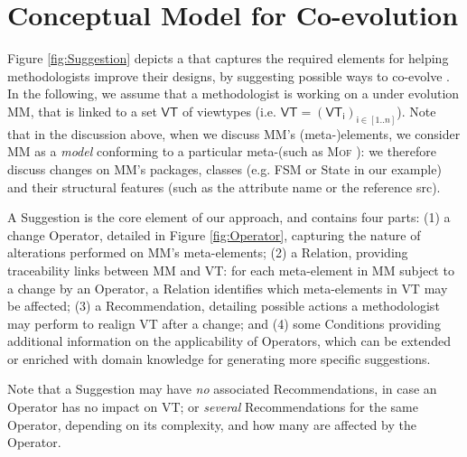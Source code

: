 \section{Conceptual Model for \Viewtype Co-evolution}
\label{sec:Suggestion}

Figure \ref{fig:Suggestion} depicts a \metamodel that captures the
required elements for helping methodologists improve their \viewtype designs,
by suggesting possible ways to co-evolve \viewtypes.
In the following, we assume that a methodologist is working on a \metamodel
under evolution \textsf{MM}, that is linked to a set $\mathsf{VT}$ of viewtypes
(i.e. $\mathsf{VT} = (\mathsf{VT}_\mathsf{i})_{\mathsf{i}\in [1..n]}$). Note that in the discussion above, when we discuss
\textsf{MM}'s (meta-)elements, we consider \textsf{MM} as a \emph{model}
conforming to a particular meta-\metamodel (such as \textsc{Mof} \cite{TR:OMG-MOF:2016}):
we therefore discuss changes on \textsf{MM}'s packages, classes (e.g. 
\textsf{FSM} or \textsf{State} in our example) and their structural features
(such as the attribute \textsf{name} or the reference \textsf{src}).

A \textsf{Suggestion} is the core element of our approach, and contains four 
parts: (1) a change \textsf{Operator}, detailed in Figure \ref{fig:Operator}, capturing the nature of
alterations performed on \textsf{MM}'s meta-elements; 
    (2) a \textsf{Relation}, providing traceability links between \textsf{MM} 
		and \textsf{VT}: for each meta-element in \textsf{MM} subject to a 
		change by an \textsf{Operator}, a \textsf{Relation} identifies which 
		meta-elements in \textsf{VT} may be affected;
    (3) a \textsf{Recommendation}, detailing possible actions a methodologist 
		may perform to realign \textsf{VT} after a change;
		 and (4) some \textsf{Condition}s providing additional information on the
		applicability of \textsf{Operator}s, which can be extended or enriched with domain knowledge for generating more specific suggestions.

Note that a \textsf{Suggestion} may 
have \emph{no} associated \textsf{Recommendation}s, in case an \textsf{Operator} has no
impact on \textsf{VT}; or \emph{several} \textsf{Recommendation}s for the same 
\textsf{Operator}, depending on its complexity, and how many \viewtypes are 
affected by the \textsf{Operator}.

